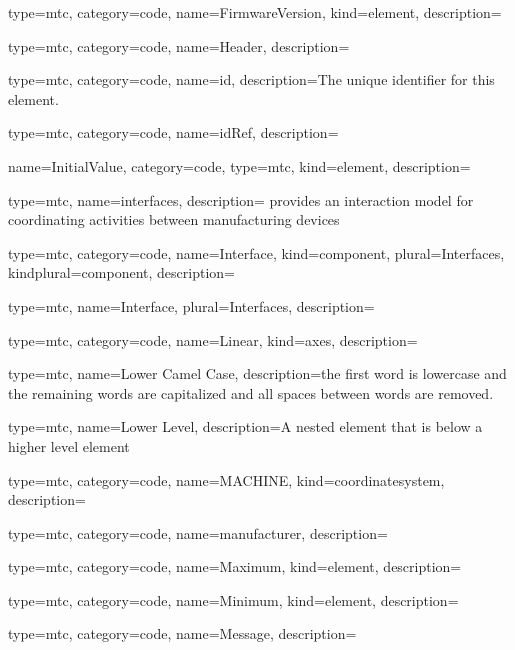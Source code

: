 {
  type=mtc,
  category=code,
  name={FirmwareVersion},
  kind={element},
  description={}
}


{
  type=mtc,
  category=code,
  name={Header},
  description={}
}


{
  type=mtc,
  category=code,
  name={id},
  description={The unique identifier for this element.}
}


{
  type=mtc,
  category=code,
  name={idRef},
  description={}
}


{
  name={InitialValue},
  category=code,
  type=mtc,
  kind={element},
  description={}
}


{
  type=mtc,
  name=interfaces,
  description={ provides an interaction model for coordinating activities between manufacturing devices}
}


{
  type=mtc,
  category=code,
  name={Interface},
  kind={component},
  plural={Interfaces},
  kindplural={component},
  description={}
}


{
  type=mtc,
  name={Interface},
  plural={Interfaces},
  description={}
}


{
  type=mtc,
  category=code,
  name={Linear},
  kind={axes},
  description={}
}


{
  type=mtc,
  name={Lower Camel Case},
  description={the first word is lowercase and the remaining words are capitalized and all spaces between words are removed.}
}


{
  type=mtc,
  name={Lower Level},
  description={A nested element that is below a higher level element}
}


{
  type=mtc,
  category=code,
  name={MACHINE},
  kind={coordinatesystem},
  description={}
}


{
  type=mtc,
  category=code,
  name={manufacturer},
  description={}
}


{
  type=mtc,
  category=code,
  name={Maximum},
  kind={element},
  description={}
}


{
  type=mtc,
  category=code,
  name={Minimum},
  kind={element},
  description={}
}


{
  type=mtc,
  category=code,
  name={Message},
  description={}
}


